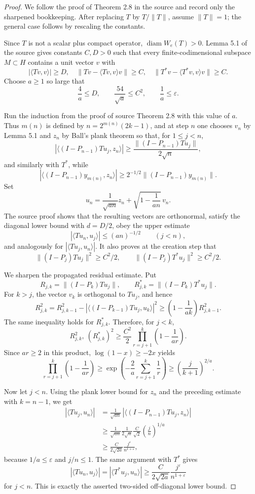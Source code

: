 \documentclass[11pt]{amsart}
\newcommand{\We}{W_{\!e}}
\begin{document}
\begin{proof}
We follow the proof of Theorem 2.8 in the source and record only the sharpened
bookkeeping.  After replacing \(T\) by \(T/\|T\|\), assume \(\|T\|=1\); the
general case follows by rescaling the constants.

Since \(T\) is not a scalar plus compact operator, \(\operatorname{diam}\We(T)>0\).
Lemma 5.1 of the source gives constants \(C,D>0\) such that every
finite-codimensional subspace \(M\subset H\) contains a unit vector \(v\) with
\[
|\langle Tv,v\rangle|\ge D,\quad
\|Tv-\langle Tv,v\rangle v\|\ge C,\quad
\|T^*v-\langle T^*v,v\rangle v\|\ge C .
\]
Choose \(a\ge1\) so large that
\[
  \frac4a\le D,\qquad \frac{54}{\sqrt a}\le C^2,\qquad \frac1a\le \varepsilon .
\]

Run the induction from the proof of source Theorem 2.8 with this value of
\(a\).  Thus \(m(n)\) is defined by \(n=2^{m(n)}(2k-1)\), and at step \(n\)
one chooses \(v_n\) by Lemma 5.1 and \(z_n\) by Ball's plank theorem so that,
for \(1\le j<n\),
\[
 |\langle (I-P_{n-1})Tu_j,z_n\rangle|
 \ge \frac{\|(I-P_{n-1})Tu_j\|}{2\sqrt n},
\]
and similarly with \(T^*\), while
\[
 |\langle (I-P_{n-1})y_{m(n)},z_n\rangle|
 \ge 2^{-1/2}\|(I-P_{n-1})y_{m(n)}\|.
\]
Set
\[
  u_n=\frac1{\sqrt{an}}z_n+\sqrt{1-\frac1{an}}\,v_n .
\]
The source proof shows that the resulting vectors are orthonormal, satisfy the
diagonal lower bound with \(d=D/2\), obey the upper estimate
\[
|\langle Tu_n,u_j\rangle|\le (an)^{-1/2}\qquad (j<n),
\]
and analogously for \(|\langle Tu_j,u_n\rangle|\).  It also proves at the
creation step that
\[
  \|(I-P_j)Tu_j\|^2\ge C^2/2,\qquad
  \|(I-P_j)T^*u_j\|^2\ge C^2/2 .
\]

We sharpen the propagated residual estimate.  Put
\[
 R_{j,k}=\|(I-P_k)Tu_j\|,\qquad R^*_{j,k}=\|(I-P_k)T^*u_j\|.
\]
For \(k>j\), the vector \(v_k\) is orthogonal to \(Tu_j\), and hence
\[
  R_{j,k}^2
  =R_{j,k-1}^2-|\langle (I-P_{k-1})Tu_j,u_k\rangle|^2
  \ge \left(1-\frac1{ak}\right)R_{j,k-1}^2 .
\]
The same inequality holds for \(R^*_{j,k}\).  Therefore, for \(j<k\),
\[
  R_{j,k}^2,\ (R^*_{j,k})^2
  \ge \frac{C^2}{2}\prod_{r=j+1}^k\left(1-\frac1{ar}\right).
\]
Since \(ar\ge2\) in this product, \(\log(1-x)\ge-2x\) yields
\[
  \prod_{r=j+1}^k\left(1-\frac1{ar}\right)
  \ge \exp\left(-\frac2a\sum_{r=j+1}^k\frac1r\right)
  \ge \left(\frac{j}{k+1}\right)^{2/a}.
\]

Now let \(j<n\).  Using the plank lower bound for \(z_n\) and the preceding
estimate with \(k=n-1\), we get
\[
\begin{aligned}
|\langle Tu_j,u_n\rangle|
&=\frac1{\sqrt{an}}\,
  |\langle (I-P_{n-1})Tu_j,z_n\rangle|  \\
&\ge \frac1{\sqrt{an}}\frac1{2\sqrt n}
     \frac{C}{\sqrt2}\left(\frac{j}{n}\right)^{1/a}  \\
&\ge \frac{C}{2\sqrt{2a}}\frac{j^\varepsilon}{n^{1+\varepsilon}},
\end{aligned}
\]
because \(1/a\le\varepsilon\) and \(j/n\le1\).  The same argument with \(T^*\)
gives
\[
|\langle Tu_n,u_j\rangle|
=|\langle T^*u_j,u_n\rangle|
\ge \frac{C}{2\sqrt{2a}}\frac{j^\varepsilon}{n^{1+\varepsilon}}
\]
for \(j<n\).  This is exactly the asserted two-sided off-diagonal lower bound.


\end{proof}
\end{document}
